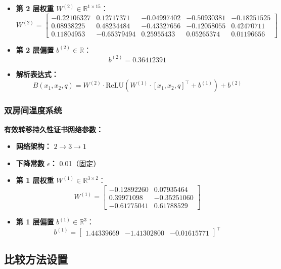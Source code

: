 \begin{itemize}
	    \item \textbf{第 2 层权重} $W^{(2)} \in \mathbb{R}^{1 \times 15}$：
	    {\footnotesize
	    \[
	    W^{(2)} = \begin{bmatrix}
	    -0.22106327 &  0.12717371 & -0.04997402 & -0.50930381 & -0.18251525 \\
	     0.08938225 &  0.48234484 & -0.43327656 & -0.12058055 &  0.42470711 \\
	     0.11804953 & -0.65379494 &  0.25955433 &  0.05265374 &  0.01196656
	    \end{bmatrix}
	    \]}
	    
	    \item \textbf{第 2 层偏置} $b^{(2)} \in \mathbb{R}$：
	    \[
	    b^{(2)} = 0.36412391
	    \]
	    
	    \item \textbf{解析表达式：}
	    \[
	    B(x_1, x_2, q) = W^{(2)} \cdot \text{ReLU}(W^{(1)} \cdot [x_1, x_2, q]^\top + b^{(1)}) + b^{(2)}
	    \]
	\end{itemize}

\subsubsection{双房间温度系统}
\label{app:two_room_neural}
\textbf{有效转移持久性证书网络参数：}

\begin{itemize}
    \item \textbf{网络架构：} $2 \rightarrow 3 \rightarrow 1$
    \item \textbf{下降常数 $\epsilon$：} 0.01（固定）
    \item \textbf{第 1 层权重} $W^{(1)} \in \mathbb{R}^{3 \times 2}$：
    \[
    W^{(1)} = \begin{bmatrix}
    -0.12892260 &  0.07935464 \\
     0.39971098 & -0.35251060 \\
    -0.61775041 &  0.61788529
    \end{bmatrix}
    \]
    
    \item \textbf{第 1 层偏置} $b^{(1)} \in \mathbb{R}^{3}$：
    \[
    b^{(1)} = \begin{bmatrix}
     1.44339669 & -1.41302800 & -0.01615771
    \end{bmatrix}^\top
    \]
\end{itemize}

\subsection{比较方法设置}

